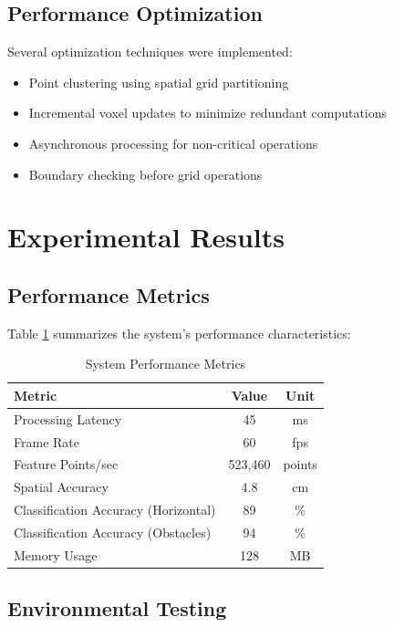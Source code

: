 \documentclass[conference]{IEEEtran}
\begin{document}
\subsection{Performance Optimization}

Several optimization techniques were implemented:
\begin{itemize}
    \item Point clustering using spatial grid partitioning
    \item Incremental voxel updates to minimize redundant computations
    \item Asynchronous processing for non-critical operations
    \item Boundary checking before grid operations
\end{itemize}

\section{Experimental Results}

\subsection{Performance Metrics}

Table \ref{tab:performance} summarizes the system's performance characteristics:

\begin{table}[H]
    \centering
    \caption{System Performance Metrics}
    \begin{tabular}{|l|c|c|}
    \hline
    Metric & Value & Unit \\
    \hline
    Processing Latency & 45 & ms \\
    Frame Rate & 60 & fps \\
    Feature Points/sec & 523,460 & points \\
    Spatial Accuracy & 4.8 & cm \\
    Classification Accuracy (Horizontal) & 89 & \% \\
    Classification Accuracy (Obstacles) & 94 & \% \\
    Memory Usage & 128 & MB \\
    \hline
    \end{tabular}
    \label{tab:performance}
\end{table}

\subsection{Environmental Testing}
\end{document}
